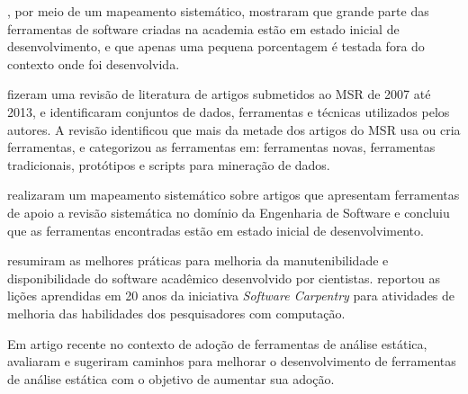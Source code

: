 , por meio de
um mapeamento sistemático, mostraram que grande parte das ferramentas de
software criadas na academia estão em estado inicial de desenvolvimento, e que
apenas uma pequena porcentagem é testada fora do contexto onde foi
desenvolvida. 

fizeram uma revisão de literatura de artigos submetidos ao MSR de 2007 até 2013,
e identificaram conjuntos de dados, ferramentas e técnicas utilizados pelos autores.
A revisão identificou que mais da metade dos artigos do MSR usa ou cria ferramentas,
e categorizou as ferramentas em:
ferramentas novas, ferramentas tradicionais, protótipos e scripts para
mineração de dados.

 realizaram um mapeamento sistemático sobre 
artigos que apresentam ferramentas de apoio a revisão sistemática no domínio da
Engenharia de Software
e concluiu que as
ferramentas encontradas estão em estado inicial de desenvolvimento.

 resumiram as melhores práticas para melhoria da
manutenibilidade e disponibilidade do software acadêmico desenvolvido por
cientistas.
 reportou  
as lições aprendidas em 20 anos da iniciativa {\it Software Carpentry} 
para atividades de melhoria das
habilidades dos pesquisadores com computação.

Em artigo recente no contexto de adoção de ferramentas de análise estática,
 avaliaram e sugeriram caminhos 
para melhorar o desenvolvimento de ferramentas de análise estática 
com o objetivo de aumentar sua adoção.




%

